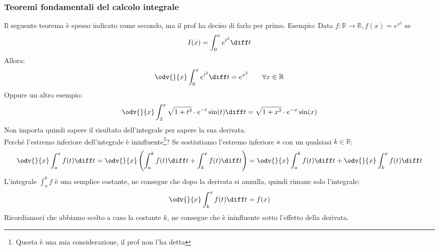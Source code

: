 \subsubsection{Teoremi fondamentali del calcolo integrale}
Il seguente teorema è spesso indicato come secondo, ma il prof ha deciso di 
farlo per primo.
\thm{
	Sia $f:]a,b[ \to \mathbb{R}$ continua e sia $c\in ]a,b[$. Allora vale:
	\begin{equation*}
		I_c'(x) = f(x) \qquad \forall x \in ]a,b[
	\end{equation*}
	Cioè:
	\begin{equation*}
		\odv{}{x} \int_c^x f(t) \diff t = f(x) \qquad \forall x \in ]a,b[
	\end{equation*}
}
Esempio: Data $f:\mathbb{R} \to \mathbb{R}, f(x) = e^{x^2}$ se 
\begin{equation*}
	I(x) = \int_0^x e^{t^2} \diff t
\end{equation*}
Allora:
\begin{equation*}
	\odv{}{x} \int_0^x e^{t^2} \diff t = e^{x^2} \qquad \forall x \in 
    \mathbb{R}
\end{equation*}
Oppure un altro esempio:
\begin{equation*}
	\odv{}{x} \int_2^x \sqrt{1+t^2} \cdot e^{-t} \sin(t) \diff t = \sqrt{1+x^2} 
    \cdot e^{-x} \sin(x)
\end{equation*}
Non importa quindi sapere il risultato dell'integrale per sapere la sua 
derivata.\\

Perché l'estremo inferiore dell'integrale è ininfluente\footnote{Questa è una 
mia considerazione, il prof non l'ha detta}? Se sostiutiamo l'estremo inferiore 
$a$ con un qualsiasi $k \in \mathbb{R}$:
\begin{equation*}
	\odv{}{x} \int_a^x f(t) \diff t = \odv{}{x} \left(\int_a^k f(t) \diff t + 
    \int_k^x f(t) \diff t\right) = \odv{}{x} \int_a^k f(t) \diff t + \odv{}{x} 
    \int_k^x f(t) \diff t
\end{equation*}
L'integrale $\int_a^k f$ è una semplice costante, ne consegue che dopo la 
derivata si annulla, quindi rimane solo l'integrale:
\begin{equation*}
	\odv{}{x} \int_k^x f(t) \diff t = f(x)
\end{equation*}
Ricordiamoci che abbiamo scelto a caso la costante $k$, ne consegue che è 
ininfluente sotto l'effetto della derivata.

